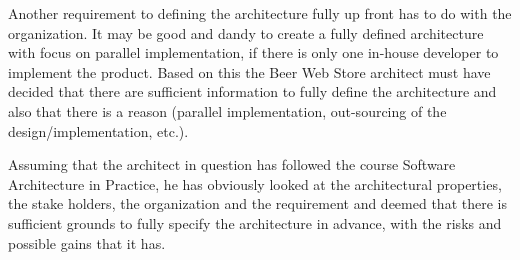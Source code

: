 Another requirement to defining the architecture fully up front has to do with the organization. It may be good and dandy to create a fully defined architecture with focus on parallel implementation, if there is only one in-house developer to implement the product.
Based on this the Beer Web Store architect must have decided that there are sufficient information to fully define the architecture and also that there is a reason (parallel implementation, out-sourcing of the design/implementation, etc.).

Assuming that the architect in question has followed the course Software Architecture in Practice, he has obviously looked at the architectural properties, the stake holders, the organization and the requirement and deemed that there is sufficient grounds to fully specify the architecture in advance, with the risks and possible gains that it has.
